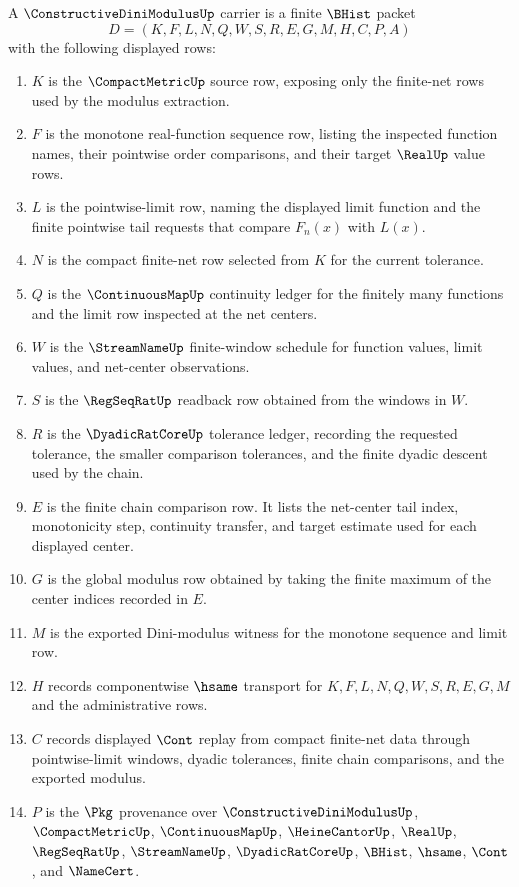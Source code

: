 \begin{definition}
\label{def:constructive-dini-modulus-carrier}
A $\ConstructiveDiniModulusUp$ carrier is a finite $\BHist$ packet
$$
D=(K,F,L,N,Q,W,S,R,E,G,M,H,C,P,A)
$$
with the following displayed rows:
\begin{enumerate}
\item $K$ is the $\CompactMetricUp$ source row, exposing only the finite-net rows used by the modulus extraction.
\item $F$ is the monotone real-function sequence row, listing the inspected function names, their pointwise order comparisons, and their target $\RealUp$ value rows.
\item $L$ is the pointwise-limit row, naming the displayed limit function and the finite pointwise tail requests that compare $F_n(x)$ with $L(x)$.
\item $N$ is the compact finite-net row selected from $K$ for the current tolerance.
\item $Q$ is the $\ContinuousMapUp$ continuity ledger for the finitely many functions and the limit row inspected at the net centers.
\item $W$ is the $\StreamNameUp$ finite-window schedule for function values, limit values, and net-center observations.
\item $S$ is the $\RegSeqRatUp$ readback row obtained from the windows in $W$.
\item $R$ is the $\DyadicRatCoreUp$ tolerance ledger, recording the requested tolerance, the smaller comparison tolerances, and the finite dyadic descent used by the chain.
\item $E$ is the finite chain comparison row. It lists the net-center tail index, monotonicity step, continuity transfer, and target estimate used for each displayed center.
\item $G$ is the global modulus row obtained by taking the finite maximum of the center indices recorded in $E$.
\item $M$ is the exported Dini-modulus witness for the monotone sequence and limit row.
\item $H$ records componentwise $\hsame$ transport for $K,F,L,N,Q,W,S,R,E,G,M$ and the administrative rows.
\item $C$ records displayed $\Cont$ replay from compact finite-net data through pointwise-limit windows, dyadic tolerances, finite chain comparisons, and the exported modulus.
\item $P$ is the $\Pkg$ provenance over $\ConstructiveDiniModulusUp$, $\CompactMetricUp$, $\ContinuousMapUp$, $\HeineCantorUp$, $\RealUp$, $\RegSeqRatUp$, $\StreamNameUp$, $\DyadicRatCoreUp$, $\BHist$, $\hsame$, $\Cont$, and $\NameCert$.

\end{enumerate}
\end{definition}

